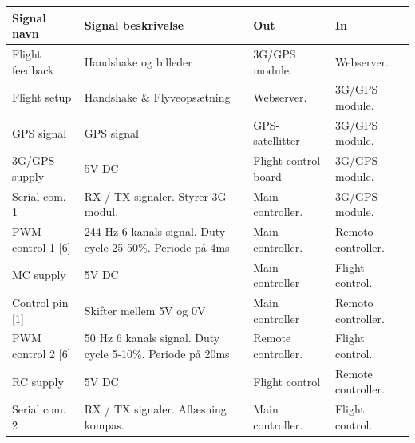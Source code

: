 \begin{table}[H]
	\centering
		\begin{tabular}	{|p{3.1 cm}|p{5.2 cm}|p{2.3 cm}|p{2.3 cm}|}  
								
		\hline
			\textbf{Signal navn} 	& \textbf{Signal beskrivelse}		& \textbf{Out} 		& \textbf{In}     \\ \hline
			Flight feedback		& Handshake og billeder				& 3G/GPS module.				& Webserver.	\\ \hline
			Flight setup		& Handshake \& Flyveopsætning  		& Webserver.			& 3G/GPS \newline module.	\\ \hline
			GPS signal	 		& GPS signal						& GPS-satellitter		& 3G/GPS \newline module.	\\ \hline			
			3G/GPS supply		& 5V DC							 	& Flight control board	& 3G/GPS \newline module.    \\ \hline
			Serial com. 1		& RX / TX signaler. \newline Styrer 3G modul.& Main \newline controller. 		& 3G/GPS \newline module.    \\ \hline
			
			
			PWM control 1 [6]	& 244 Hz 6 kanals signal. Duty \newline cycle 25-50\%. Periode på 4ms	& Main \newline controller.	& Remoto \newline controller.	\\ \hline
			MC supply		& 5V DC							 	& Main \newline controller	& Flight \newline control.    \\ \hline
			Control pin [1]		& Skifter mellem 5V og 0V							 	& Main \newline controller	& Remoto \newline  controller.    \\ \hline
			
			PWM control 2 [6]	& 50 Hz 6 kanals signal. Duty \newline cycle 5-10\%. Periode på 20ms	& Remote \newline controller.	& Flight \newline control.	\\ \hline		RC supply			& 5V DC							 	& Flight control	& Remote \newline controller.    \\ \hline
			Serial com. 2		& RX / TX signaler. \newline Aflæsning kompas. & Main \newline controller.	& Flight \newline control.	\\ \hline 	
			

\end{tabular}
\end{table}
